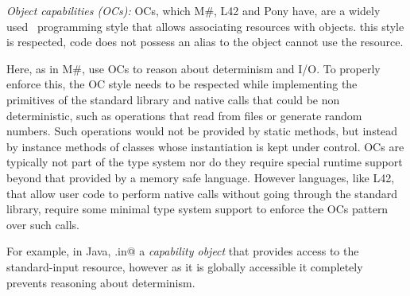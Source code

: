 
\textit{Object capabilities (OCs):}
OCs, which M\#, L42 and Pony have, are a widely used~\cite{???} programming style that allows associating resources with objects.  this style
is respected, code  does not possess an alias to the object cannot use the resource.

Here, as in M\#, use OCs to reason about determinism and I/O. To properly enforce this, the OC style needs to be respected while implementing the primitives of the standard library and native calls that could be non deterministic, such as operations that read from files or generate random numbers. Such operations would not be provided by static methods, but instead by instance methods of classes whose instantiation is kept under control. OCs are typically not part of the type system nor do they require special runtime support beyond that provided by a memory safe language. However languages, like L42, that allow user code to perform native calls without going through the standard library, require some minimal type system support to enforce the OCs pattern over such calls.
 





\lstset{language=Java}
 For example, in Java, \Q@System.in@
 \lstset{language=FortyTwo} 
   a \emph{capability object} that provides access to the standard-input resource, however as it is globally accessible it completely prevents reasoning about determinism. 
 


